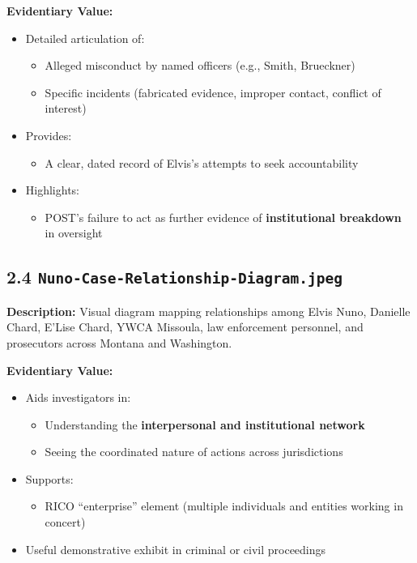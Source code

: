 \documentclass[11pt, letterpaper]{article}
\begin{document}
\textbf{Evidentiary Value:}

\begin{itemize}[leftmargin=*]
  \item Detailed articulation of:
    \begin{itemize}
      \item Alleged misconduct by named officers (e.g., Smith, Brueckner)
      \item Specific incidents (fabricated evidence, improper contact, conflict of interest)
    \end{itemize}
  \item Provides:
    \begin{itemize}
      \item A clear, dated record of Elvis's attempts to seek accountability
    \end{itemize}
  \item Highlights:
    \begin{itemize}
      \item POST's failure to act as further evidence of \textbf{institutional breakdown} in oversight
    \end{itemize}
\end{itemize}

\subsection{2.4 \texttt{Nuno-Case-Relationship-Diagram.jpeg}}

\textbf{Description:} Visual diagram mapping relationships among Elvis Nuno, Danielle Chard, E'Lise Chard, YWCA Missoula, law enforcement personnel, and prosecutors across Montana and Washington.

\textbf{Evidentiary Value:}

\begin{itemize}[leftmargin=*]
  \item Aids investigators in:
    \begin{itemize}
      \item Understanding the \textbf{interpersonal and institutional network}
      \item Seeing the coordinated nature of actions across jurisdictions
    \end{itemize}
  \item Supports:
    \begin{itemize}
      \item RICO ``enterprise'' element (multiple individuals and entities working in concert)
    \end{itemize}
  \item Useful demonstrative exhibit in criminal or civil proceedings
\end{itemize}
\end{document}
